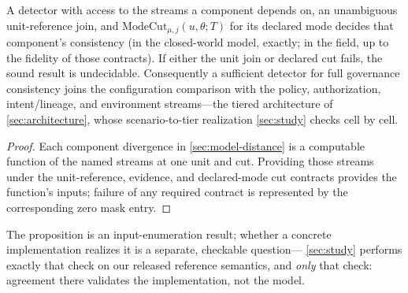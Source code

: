 \begin{proposition}
\label{prop:tiers}
A detector with access to the streams a component depends on, an unambiguous
unit-reference join, and $\mathrm{ModeCut}_{\mu,j}(u,\theta;T)$ for its
declared mode decides that component's consistency (in the closed-world
model, exactly; in the field, up to the fidelity of those contracts). If
either the unit join or declared cut fails, the sound result is undecidable.
Consequently a sufficient detector for full
governance consistency joins the configuration comparison with the policy,
authorization, intent/lineage, and environment streams---the tiered
architecture of \cref{sec:architecture}, whose scenario-to-tier realization
\cref{sec:study} checks cell by cell.
\end{proposition}
\begin{proof}
Each component divergence in \cref{sec:model-distance} is a computable
function of the named streams at one unit and cut. Providing those streams
under the unit-reference, evidence, and declared-mode cut contracts provides
the function's inputs; failure of any required contract is represented by the
corresponding zero mask entry.
\end{proof}

The proposition is an input-enumeration result; whether a concrete
implementation realizes it is a separate, checkable question---%
\cref{sec:study} performs exactly that check on our released reference
semantics, and \emph{only} that check: agreement there validates the
implementation, not the model.

